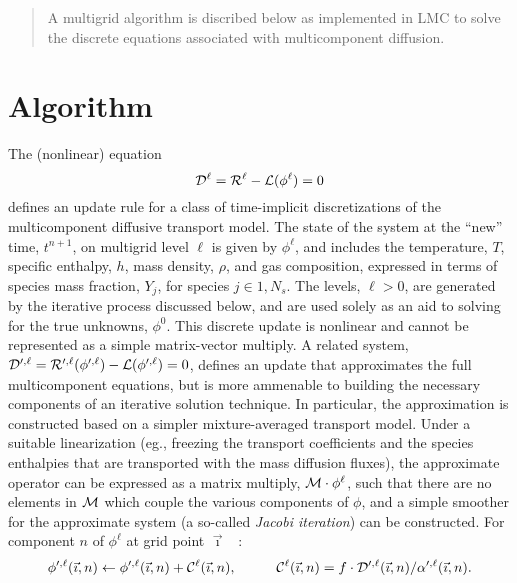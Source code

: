 \documentclass[11pt]{article}
\begin{document}
\begin{abstract}
A multigrid algorithm is discribed below as implemented in LMC to solve the discrete equations
associated with multicomponent diffusion.
\end{abstract}

\newcommand{\gp}{{\vec \imath}}
\newcommand{\told}{{t^{n}}}
\newcommand{\tnew}{{t^{n+1}}}
\newcommand{\nua}{{\nu_1}}
\newcommand{\nub}{{\nu_2}}


\section{Algorithm}
The (nonlinear) equation
\begin{equation}
   {\cal D}^{\ell} = {\cal R}^{\ell} - {\cal L}({\phi}^{\ell}) = 0 
  \label{eqn:NLupdate}
\end{equation}
defines an update rule for a class of time-implicit discretizations of
the multicomponent diffusive transport model.  The state of the system
at the ``new'' time, $\tnew$, on multigrid level $\ell$ is given by
${\phi}^{\ell}$, and includes the temperature, $T$, specific enthalpy,
$h$, mass density, $\rho$, and gas composition, expressed in terms of
species mass fraction, $Y_{j}$, for species $j\in{1,N_{s}}$.  The
levels, $\ell>0$, are generated by the iterative process discussed
below, and are used solely as an aid to solving for the true unknowns,
${\phi}^{0}$.  This discrete update is nonlinear and cannot be
represented as a simple matrix-vector multiply.  A related system,
${\cal D}^{\prime,\ell} = {\cal R}^{\prime,\ell}({\phi}^{\prime,\ell})
- {\cal L}({\phi}^{\prime,\ell}) = 0$, defines an update that
approximates the full multicomponent equations, but is more ammenable
to building the necessary components of an iterative solution
technique.  In particular, the approximation is constructed based on a
simpler mixture-averaged transport model.  Under a suitable
linearization (eg., freezing the transport coefficients and the
species enthalpies that are transported with the mass diffusion
fluxes), the approximate operator can be expressed as a matrix
multiply, ${\cal M} \cdot {\phi}^{\ell}$, such that there are no
elements in ${\cal M}$ which couple the various components of $\phi$,
and a simple smoother for the approximate system
(a so-called {\it Jacobi iteration}) can be constructed.  For
component $n$ of ${\phi}^{\ell}$ at grid point $\gp$ \ :
\begin{equation}
       {\phi}^{\prime,\ell}(\gp,n) \leftarrow {\phi}^{\prime,\ell}(\gp,n) + {\cal C}^{\ell}(\gp,n), \hspace{1cm}
                {\cal C}^{\ell}(\gp,n) = f \cdot {\cal D}^{\prime,\ell}(\gp,n) / {\alpha}^{\prime,\ell}(\gp,n).
  \label{eqn:linUpdate}
\end{equation}
\end{document}
